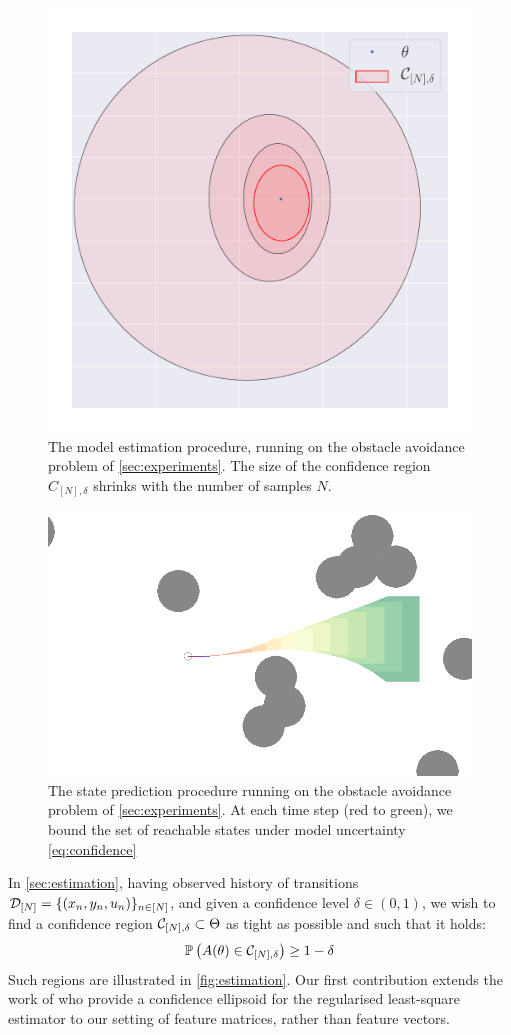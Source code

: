 \documentclass{article}
\begin{document}
\begin{figure}[t]
	\centering
	\includegraphics[trim={0 2cm 0 0}, clip, width=0.6\linewidth]{img/ellipsoid}
	\caption{The model estimation procedure, running on the obstacle avoidance problem of \autoref{sec:experiments}. The size of the confidence region $C_{[N],\delta}$ shrinks with the number of samples $N$.}
	\label{fig:estimation}
\end{figure}

\begin{figure}[t]
	\centering
	\includegraphics[width=0.8\linewidth]{img/obstacle_small}
	\caption{The state prediction procedure running on the obstacle avoidance problem of \autoref{sec:experiments}. At each time step (red to green), we bound the set of reachable states under model uncertainty \eqref{eq:confidence}}
	\label{fig:prediction}
\end{figure}

In \autoref{sec:estimation}, having observed history of transitions $\mathcal{D}_{[N]} = \{(x_n, y_n,u_n)\}_{n\in[N]}$, and given a confidence level $\delta\in(0, 1)$, we wish to find a confidence region $\mathcal{C}_{[N],\delta} \subset \Theta$ as tight as possible and such that it holds:
\begin{align}
\mathbb{P}\left(A(\theta)\in \mathcal{C}_{[N],\delta}\right) \geq 1-\delta
\label{eq:confidence}
\end{align}
Such regions are illustrated in \autoref{fig:estimation}. Our first contribution extends the work of \citet{Abbasi2011} who provide a confidence ellipsoid for the regularised least-square estimator to our setting of feature matrices, rather than feature vectors.
\end{document}
